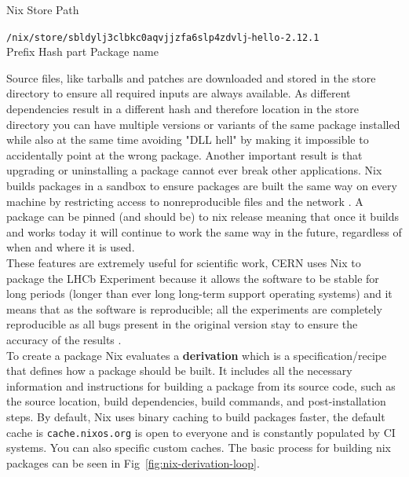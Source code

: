 \begin{figureBox}[label={fig:nix-store-path}, width=0.8\linewidth]{Nix Store Path}
  \begin{tabbing}
    \={\color{Purple}\texttt{/nix/store/}}\={\color{RoyalBlue}\texttt{sbldylj3clbkc0aqvjjzfa6slp4zdvlj}}-\={\color{Orange}\texttt{hello-2.12.1}} \\
    \>\small{Prefix} \>\small {Hash part} \>\small {Package name}
  \end{tabbing}
\end{figureBox}

Source files, like tarballs and patches are downloaded and stored in the store directory to ensure all required inputs are always available. As different dependencies result in a different hash and therefore location in the store directory you can have multiple versions or variants of the same package installed while also at the same time avoiding "DLL hell" by making it impossible to accidentally point at the wrong package. Another important result is that upgrading or uninstalling a package cannot ever break other applications. Nix builds packages in a sandbox to ensure packages are built the same way on every machine by restricting access to nonreproducible files and the network \cite{nixcon-sandboxs}. A package can be pinned (and should be) to nix release meaning that once it builds and works today it will continue to work the same way in the future, regardless of when and where it is used. \\

These features are extremely useful for scientific work, CERN uses Nix to package the LHCb Experiment because it allows the software to be stable for long periods (longer than ever long long-term support operating systems) and it means that as the software is reproducible; all the experiments are completely reproducible as all bugs present in the original version stay to ensure the accuracy of the results \cite{LHCbNix}. \\

To create a package Nix evaluates a \textbf{derivation} which is a specification/recipe that defines how a package should be built. It includes all the necessary information and instructions for building a package from its source code, such as the source location, build dependencies, build commands, and post-installation steps. By default, Nix uses binary caching to build packages faster, the default cache is \texttt{cache.nixos.org} is open to everyone and is constantly populated by CI systems. You can also specific custom caches. The basic process for building nix packages can be seen in Fig~\ref{fig:nix-derivation-loop}.

